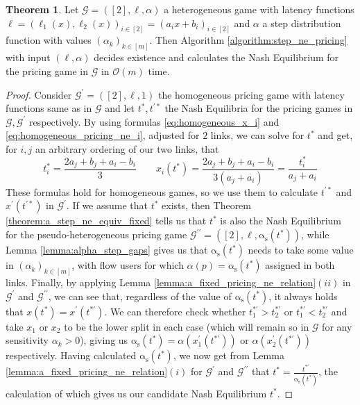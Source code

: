 \documentclass[10pt,a4paper]{book}
\newcommand{\as}{\mathrm{\alpha_s}}
\newcommand{\Gm}{\mathcal{G}}
\theoremstyle{definition}
\newtheorem{theorem}[definition]{Theorem}
\theoremstyle{comment}
\begin{document}
\begin{theorem}
	Let $\Gm = ([2], \ell, \alpha)$ a heterogeneous game with latency functions $\ell = (\ell_1(x), \ell_2(x))_{i \in [2]} = (a_ix + b_i)_{i \in [2]}$ and $\alpha$ a step distribution function with values $(\alpha_k)_{k \in [m]}$.
	Then Algorithm \ref{algorithm:step_ne_pricing} with input $(\ell, \alpha)$ decides existence and calculates the Nash Equilibrium for the pricing game in $\Gm$ in $\mathcal{O}(m)$ time.
\end{theorem}

\begin{proof}
	Consider $\Gm^\prime = ([2], \ell, 1)$ the homogeneous pricing game with latency functions same as in $\Gm$ and let $t^*, t^{\prime*}$ the Nash Equilibria for the pricing games in $\Gm, \Gm^\prime$ respectively.
	By using formulas \ref{eq:homogeneous_x_i} and \ref{eq:homogeneous_pricing_ne_i}, adjusted for $2$ links, we can solve for $t^{*}$ and get, for $i, j$ an arbitrary ordering of our two links, that
	\[
		t_i^* = \frac{2 a_j + b_j + a_i - b_i}{3} \qquad x_i(t^*) = \frac{2 a_j + b_j + a_i - b_i}{3(a_j + a_i)} = \frac{t_i^*}{a_j + a_i}
	\]
	These formulas hold for homogeneous games, so we use them to calculate $t^{\prime*}$ and $x^\prime(t^{\prime*})$ in $\Gm^\prime$.
	If we assume that $t^*$ exists, then Theorem \ref{theorem:a_step_ne_equiv_fixed} tells us that $t^*$ is also the Nash Equilibrium for the pseudo-heterogeneous pricing game $\Gm^{\prime\prime} = ([2], \ell, \as(t^*))$, while Lemma \ref{lemma:alpha_step_gaps} gives us that $\as(t^*)$ needs to take some value in $(\alpha_k)_{k \in [m]}$, with flow users for which $\alpha(p) = \as(t^*)$ assigned in both links.
	Finally, by applying Lemma \ref{lemma:a_fixed_pricing_ne_relation}$(ii)$ in $\Gm^\prime$ and $\Gm^{\prime\prime}$, we can see that, regardless of the value of $\as(t^*)$, it always holds that $x(t^*) = x^\prime(t^{*\prime})$.
	We can therefore check whether $t_1^{*\prime} > t_2^{*\prime}$ or $t_1^{*\prime} < t_2^{*\prime}$ and take $x_1$ or $x_2$ to be the lower split in each case (which will remain so in $\Gm$ for any sensitivity $\alpha_k > 0$), giving us $\as(t^*) = \alpha(x_1^\prime(t^{*\prime}))$ or $\alpha(x_2^\prime(t^{*\prime}))$ respectively.
	Having calculated $\as(t^*)$, we now get from Lemma \ref{lemma:a_fixed_pricing_ne_relation}$(i)$ for $\Gm^\prime$ and $\Gm^{\prime\prime}$ that $t^* = \tfrac{t^{*\prime}}{\as(t^*)}$, the calculation of which gives us our candidate Nash Equilibrium $t^*$.


\end{proof}
\end{document}
